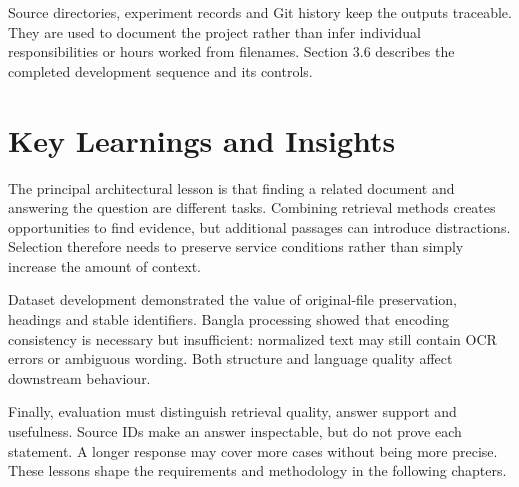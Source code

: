 Source directories, experiment records and Git history keep the outputs traceable. They are used to document the project rather than infer individual responsibilities or hours worked from filenames. Section 3.6 describes the completed development sequence and its controls.

\section{Key Learnings and Insights}
The principal architectural lesson is that finding a related document and answering the question are different tasks. Combining retrieval methods creates opportunities to find evidence, but additional passages can introduce distractions. Selection therefore needs to preserve service conditions rather than simply increase the amount of context.

Dataset development demonstrated the value of original-file preservation, headings and stable identifiers. Bangla processing showed that encoding consistency is necessary but insufficient: normalized text may still contain OCR errors or ambiguous wording. Both structure and language quality affect downstream behaviour.

Finally, evaluation must distinguish retrieval quality, answer support and usefulness. Source IDs make an answer inspectable, but do not prove each statement. A longer response may cover more cases without being more precise. These lessons shape the requirements and methodology in the following chapters.
